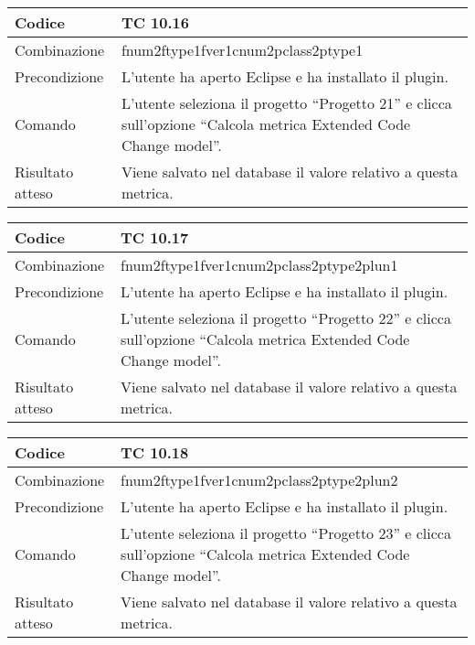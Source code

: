 \begin{table}[ht]
\begin{tabular}{|p{3cm}|p{9cm}|}
\hline
\cellcolor{lightgray}Codice				& TC 10.16								\\
\hline
\cellcolor{lightgray}Combinazione		& fnum2ftype1fver1cnum2pclass2ptype1									\\
\hline
\cellcolor{lightgray}Precondizione		& L'utente ha aperto Eclipse e ha installato il plugin.		\\
\hline
\cellcolor{lightgray}Comando			& L'utente seleziona il progetto ``Progetto 21''  e clicca sull'opzione ``Calcola metrica Extended Code Change model''.	\\
\hline
\cellcolor{lightgray}Risultato atteso	& Viene salvato nel database il valore relativo a questa metrica.\\
\hline
\end{tabular}
\end{table}

\begin{table}[ht]
\begin{tabular}{|p{3cm}|p{9cm}|}
\hline
\cellcolor{lightgray}Codice				& TC 10.17								\\
\hline
\cellcolor{lightgray}Combinazione		& fnum2ftype1fver1cnum2pclass2ptype2plun1									\\
\hline
\cellcolor{lightgray}Precondizione		& L'utente ha aperto Eclipse e ha installato il plugin.		\\
\hline
\cellcolor{lightgray}Comando			& L'utente seleziona il progetto ``Progetto 22''  e clicca sull'opzione ``Calcola metrica Extended Code Change model''.	\\
\hline
\cellcolor{lightgray}Risultato atteso	& Viene salvato nel database il valore relativo a questa metrica.\\
\hline
\end{tabular}
\end{table}

\begin{table}[ht]
\begin{tabular}{|p{3cm}|p{9cm}|}
\hline
\cellcolor{lightgray}Codice				& TC 10.18								\\
\hline
\cellcolor{lightgray}Combinazione		& fnum2ftype1fver1cnum2pclass2ptype2plun2									\\
\hline
\cellcolor{lightgray}Precondizione		& L'utente ha aperto Eclipse e ha installato il plugin.		\\
\hline
\cellcolor{lightgray}Comando			& L'utente seleziona il progetto ``Progetto 23''  e clicca sull'opzione ``Calcola metrica Extended Code Change model''.	\\
\hline
\cellcolor{lightgray}Risultato atteso	& Viene salvato nel database il valore relativo a questa metrica.\\
\hline
\end{tabular}
\end{table}

